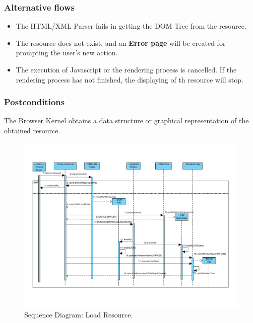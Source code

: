 \documentclass[prodmode,acmtecs]{acmsmall}
\begin{document}
    \subsubsection*{Alternative flows} 
    \begin{itemize}\leftskip2.2em
    \item The HTML/XML Parser fails in getting the DOM Tree from the resource.
    \item The resource does not exist, and an \textbf{Error page} will be created for prompting the user's new action.
    \item The execution of Javascript or the rendering process is cancelled. If the rendering process has not finished, the displaying of th resource will stop.
      \end{itemize}
    \subsubsection*{Postconditions} The Browser Kernel obtains a data structure or graphical representation of the obtained resource.


    \begin{landscape}
      \begin{figure}[h!t]
      \vspace*{-2cm}
          \centering
          \hspace*{-1cm}\includegraphics[scale=0.8]{figures/LoadResource-v3.pdf}
          \vspace*{-2.2cm}
          \caption{Sequence Diagram: Load Resource.}
          \label{fig:LoadResource}
      \end{figure}
    \end{landscape}
\end{document}
